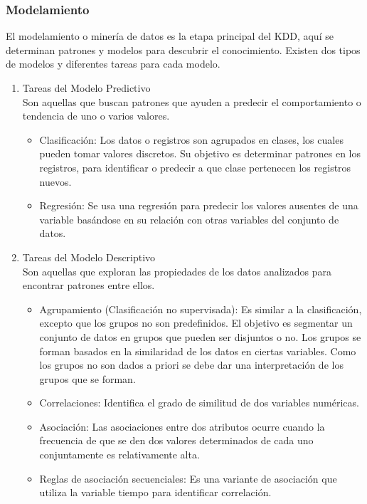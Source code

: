 \subsubsection{Modelamiento}

El modelamiento o minería de datos es la etapa principal del KDD, aquí se determinan patrones y modelos para descubrir el conocimiento. Existen dos tipos de modelos y diferentes tareas para cada modelo.

\begin{enumerate}
    \item Tareas del Modelo Predictivo\\
    Son aquellas que buscan patrones que ayuden a predecir el comportamiento o tendencia de uno o varios valores.\\
    
    \begin{itemize}
        \item Clasificación:
        Los datos o registros son agrupados en clases, los cuales pueden tomar valores discretos. Su objetivo es determinar patrones en los registros, para identificar o predecir a que clase pertenecen los registros nuevos.
        
        \item Regresión:
        Se usa una regresión para predecir los valores ausentes de una variable basándose en su relación con otras variables del conjunto de datos.
    \end{itemize}
    
    \item Tareas del Modelo Descriptivo\\
    Son aquellas que exploran las propiedades de los datos analizados para encontrar patrones entre ellos.\\
    
    \begin{itemize}
        \item Agrupamiento (Clasificación no supervisada):
        Es similar a la clasificación, excepto que los grupos no son predefinidos. El objetivo es segmentar un conjunto de datos en grupos que pueden ser disjuntos o no. Los grupos se forman basados en la similaridad de los datos en ciertas variables. Como los grupos no son dados a priori se debe dar una interpretación de los grupos que se forman.
        
        \item Correlaciones:
        Identifica el grado de similitud de dos variables numéricas.
        \item Asociación:
        Las asociaciones entre dos atributos ocurre cuando la frecuencia de que se den dos valores determinados de cada uno conjuntamente es relativamente alta.
        \item Reglas de asociación secuenciales:
        Es una variante de asociación que utiliza la variable tiempo para identificar correlación.

        
    \end{itemize}
    
\end{enumerate}


